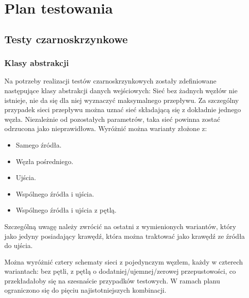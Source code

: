 \documentclass[10pt]{dokument-tiwo}
\begin{document}
\MakeDokumentMeta


\section{Plan testowania}
\subsection{Testy czarnoskrzynkowe}
\subsubsection{Klasy abstrakcji}
Na potrzeby realizacji testów czarnoskrzynkowych zostały zdefiniowane następujące klasy abstrakcji danych wejściowych:
Sieć bez żadnych węzłów nie istnieje, nie da się dla niej wyznaczyć maksymalnego przepływu.
Za szczególny przypadek sieci przepływu można uznać sieć składającą się z dokładnie jednego węzła. Niezależnie od pozostałych parametrów, taka sieć powinna zostać odrzucona jako nieprawidłowa. Wyróżnić można warianty złożone z:
\begin{itemize}
    \item Samego źródła.
    \item Węzła pośredniego.
    \item Ujścia.
    \item Wspólnego źródła i ujścia.
    \item Wspólnego źródła i ujścia z pętlą.
\end{itemize}
Szczególną uwagę należy zwrócić na ostatni z wymienionych wariantów, który jako jedyny posiadający krawędź, która można traktować jako krawędź ze źródła do ujścia.

Można wyróżnić cztery schematy sieci z pojedynczym węzłem, każdy w czterech wariantach: bez pętli, z pętlą o dodatniej/ujemnej/zerowej przepustowości, co przekładałoby się na szesnaście przypadków testowych. W ramach planu ograniczono się do pięciu najistotniejszych kombinacji.
\end{document}
